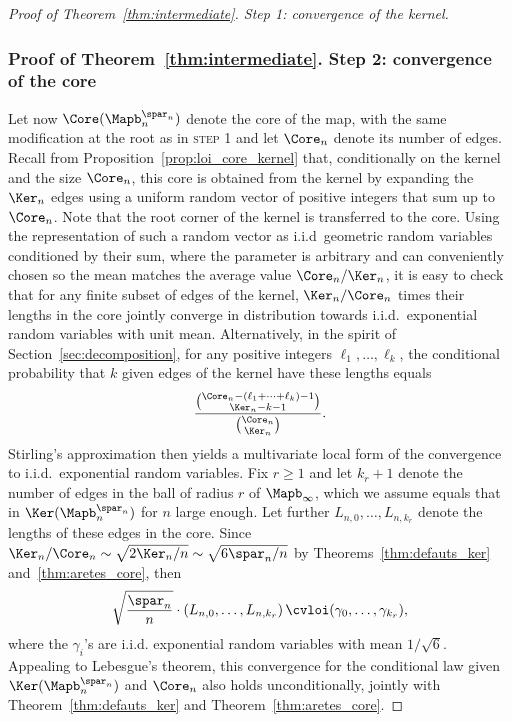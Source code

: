 \begin{proof}[Proof of Theorem~\ref{thm:intermediate}. Step 1: convergence of the kernel]
\subsubsection*{Proof of Theorem~\ref{thm:intermediate}. Step 2: convergence of the core}
Let now $\Core(\Mapb_n^{\spar_n})$ denote the core of the map, with the same modification at the root as in \textsc{step 1} and let $\Core_n$ denote its number of edges.
Recall from Proposition~\ref{prop:loi_core_kernel} that, conditionally on the kernel and the size $\Core_n$, this core is obtained from the kernel by expanding the $\Ker_n$ edges using a uniform random vector of positive integers that sum up to $\Core_n$. Note that the root corner of the kernel is transferred to the core.
Using the representation of such a random vector as i.i.d~geometric random variables conditioned by their sum, where the parameter is arbitrary and can conveniently chosen so the mean matches the average value $\Core_n/\Ker_n$, it is easy to check that for any finite subset of edges of the kernel, $\Ker_n / \Core_n$ times their lengths in the core jointly converge in distribution towards i.i.d.~exponential random variables with unit mean. Alternatively, in the spirit of Section~\ref{sec:decomposition}, for any positive integers $\ell_1, \dots, \ell_k$, the conditional probability that $k$ given edges of the kernel have these lengths equals
\[
\frac{\binom{\Core_n-(\ell_1+\dots+\ell_k)-1}{\Ker_n-k-1}}{\binom{\Core_n}{\Ker_n}}.
\]
Stirling's approximation then yields a multivariate local form of the convergence to i.i.d.~exponential random variables.
Fix $r \ge 1$ and let $k_r+1$ denote the number of edges in the ball of radius $r$ of $\Mapb_\infty$, which we assume equals that in $\Ker(\Mapb_n^{\spar_n})$ for $n$ large enough. Let further $L_{n,0}, \dots, L_{n,k_r}$ denote the lengths of these edges in the core. Since $\Ker_n / \Core_n \sim \sqrt{2\Ker_n/n} \sim \sqrt{6\spar_n/n}$ by Theorems~\ref{thm:defauts_ker} and~\ref{thm:aretes_core}, then
\begin{equation}\label{eq:convergence_longueurs_core}
\sqrt{\frac{\spar_n}{n}} \cdot \left(L_{n,0}, \dots, L_{n,k_r}\right) \cvloi (\gamma_0, \dots, \gamma_{k_r}),
\end{equation}
where the $\gamma_i$'s are i.i.d. exponential random variables with mean $1/\sqrt{6}$. Appealing to \eg Lebesgue's theorem, this convergence for the conditional law given $\Ker(\Mapb_n^{\spar_n})$ and $\Core_n$ also holds unconditionally, jointly with Theorem~\ref{thm:defauts_ker} and Theorem~\ref{thm:aretes_core}.


\end{proof}
